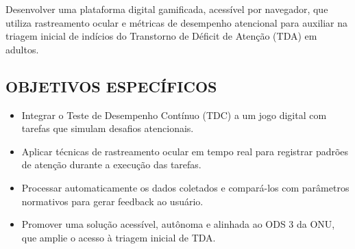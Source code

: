 Desenvolver uma plataforma digital gamificada, acessível por navegador, que utiliza
rastreamento ocular e métricas de desempenho atencional para auxiliar na triagem inicial de
indícios do Transtorno de Déficit de Atenção (TDA) em adultos.

\subsection*{OBJETIVOS ESPECÍFICOS} 

\begin{itemize}
    \item Integrar o Teste de Desempenho Contínuo (TDC) a um jogo digital com tarefas que
    simulam desafios atencionais.
    \item  Aplicar técnicas de rastreamento ocular em tempo real para registrar padrões de
    atenção durante a execução das tarefas.
    \item Processar automaticamente os dados coletados e compará-los com parâmetros
    normativos para gerar feedback ao usuário.
    \item Promover uma solução acessível, autônoma e alinhada ao ODS 3 da ONU, que amplie
    o acesso à triagem inicial de TDA.
\end{itemize}
